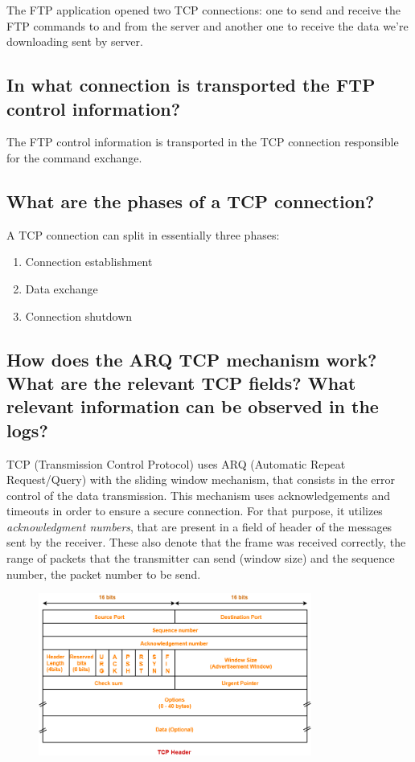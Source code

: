 \documentclass[11pt]{report}
\begin{document}
The FTP application opened two TCP connections: one to send and receive the FTP commands to and from the server and another one to receive the data we're downloading sent by server.

\subsection{In what connection is transported the FTP control information?}

The FTP control information is transported in the TCP connection responsible for the command exchange.

\subsection{What are the phases of a TCP connection?}

A TCP connection can split in essentially three phases:

\begin{enumerate}
    \item Connection establishment
    \item Data exchange
    \item Connection shutdown
\end{enumerate}

\subsection{How does the ARQ TCP mechanism work? What are the relevant TCP
fields? What relevant information can be observed in the logs?}

TCP (Transmission Control Protocol) uses ARQ (Automatic Repeat Request/Query) with the sliding window mechanism, that consists in the error control of the data transmission. This mechanism uses acknowledgements and timeouts in order to ensure a secure connection. 
For that purpose, it utilizes \textit{acknowledgment numbers}, that are present in a field of header of the messages sent by the receiver. These also denote that the frame was received correctly, the range of packets that the transmitter can send (window size) and the sequence number, the packet number to be send.

\begin{figure}[h!]
    \centering
    \includegraphics[width=0.8\textwidth]{images/TCP_Header_Format.png}
\end{figure}
\end{document}
